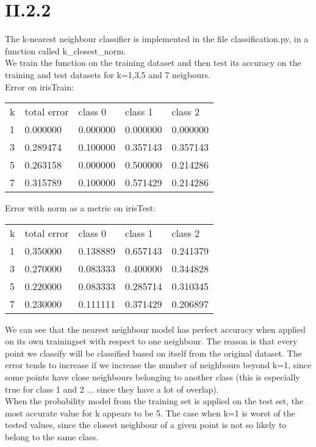 \documentclass[a4paper,10pt]{article}
\begin{document}
\section*{II.2.2}
The k-nearest neighbour classifier is implemented in the file classification.py,
in a function called k\_closest\_norm.\\
We train the function on the training dataset and then test its accuracy
on the training and test datasets for k=1,3,5 and 7 neigbours.\\
Error on irisTrain:\\
\begin{center}
\begin{tabular}{l|llll}
 k & total error & class 0 & class 1 & class 2\\
 1 & 0.000000 & 0.000000 & 0.000000 & 0.000000\\
 3 & 0.289474 & 0.100000 & 0.357143 & 0.357143\\
 5 & 0.263158 & 0.000000 & 0.500000 & 0.214286\\
 7 & 0.315789 & 0.100000 & 0.571429 & 0.214286\\
\end{tabular}
\end{center}
Error with norm as a metric on irisTest:\\
\begin{center}
\begin{tabular}{l|llll}
 k & total error & class 0 & class 1 & class 2\\
 1 & 0.350000 & 0.138889 & 0.657143 & 0.241379\\
 3 & 0.270000 & 0.083333 & 0.400000 & 0.344828\\
 5 & 0.220000 & 0.083333 & 0.285714 & 0.310345\\
 7 & 0.230000 & 0.111111 & 0.371429 & 0.206897\\
\end{tabular}
\end{center}
We can see that the nearest neighbour model has perfect accuracy when
applied on its own trainingset with respect to one neighbour. The reason
is that every point we classify will be classified based on itself from
the original dataset. The error tends to increase if we increase the number of
neighbours beyond k=1, since some points have close neighbours belonging to another class (this is especially true for class 1 and 2 ... since they have a lot of overlap).\\
When the probability model from the training set is applied on the test set,
the most accurate value for k appears to be 5. The case when k=1 is worst
of the tested values, since the closest neighbour of a given point is not
so likely to belong to the same class.
\end{document}
